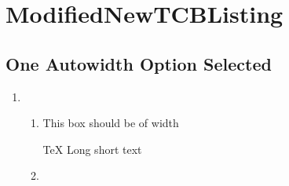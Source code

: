 \documentclass[11pt, titlepage, a4paper, oneside]{book}
\begin{document}
\chapter{ModifiedNewTCBListing}
\section{One Autowidth Option Selected}
\begin{enumerate}
    \item {}
    \begin{enumerate}
        \item {}
        
        This box should be of width 
        \begin{code*}
            [
                ,Title=smol
                ,autowidth = title
            ]{\TeX}
            Long short text
        \end{code*}
        \item {}
        

\end{enumerate}
\end{enumerate}
\end{document}
